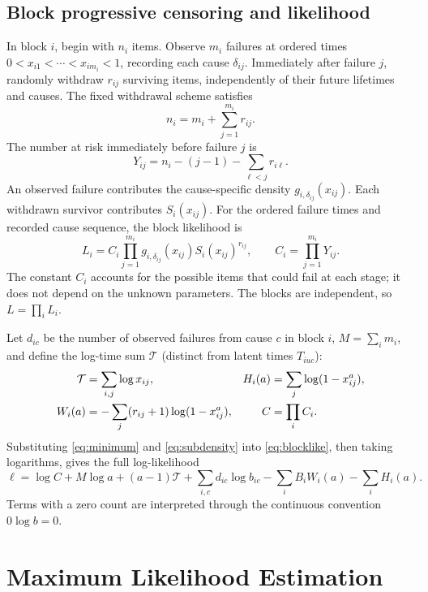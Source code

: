 \documentclass[a4paper,11pt]{article}
\begin{document}
\subsection{Block progressive censoring and likelihood}
In block $i$, begin with $n_i$ items. Observe $m_i$ failures at ordered times $0<x_{i1}<\cdots<x_{im_i}<1$, recording each cause $\delta_{ij}$. Immediately after failure $j$, randomly withdraw $r_{ij}$ surviving items, independently of their future lifetimes and causes. The fixed withdrawal scheme satisfies
\begin{equation}\label{eq:scheme}
n_i=m_i+\sum_{j=1}^{m_i}r_{ij}.
\end{equation}
The number at risk immediately before failure $j$ is
\begin{equation}\label{eq:risk}
Y_{ij}=n_i-(j-1)-\sum_{\ell<j}r_{i\ell}.
\end{equation}
An observed failure contributes the cause-specific density $g_{i,\delta_{ij}}(x_{ij})$. Each withdrawn survivor contributes $S_i(x_{ij})$. For the ordered failure times and recorded cause sequence, the block likelihood is
\begin{equation}\label{eq:blocklike}
L_i=C_i\prod_{j=1}^{m_i}g_{i,\delta_{ij}}(x_{ij})S_i(x_{ij})^{r_{ij}},\qquad
C_i=\prod_{j=1}^{m_i}Y_{ij}.
\end{equation}
The constant $C_i$ accounts for the possible items that could fail at each stage; it does not depend on the unknown parameters. The blocks are independent, so $L=\prod_i L_i$.

Let $d_{ic}$ be the number of observed failures from cause $c$ in block $i$, $M=\sum_i m_i$, and define the log-time sum $\mathcal{T}$ (distinct from latent times $T_{iuc}$):
\begin{align}\label{eq:stats}
\mathcal{T}&=\sum_{i,j}\log x_{ij},&
H_i(a)&=\sum_j\log(1-x_{ij}^a),\\\notag
W_i(a)&=-\sum_j(r_{ij}+1)\log(1-x_{ij}^a),&
C&=\prod_i C_i.
\end{align}
Substituting \eqref{eq:minimum} and \eqref{eq:subdensity} into \eqref{eq:blocklike}, then taking logarithms, gives the full log-likelihood
\begin{equation}\label{eq:loglike}
\boxed{\ell=\log C+M\log a+(a-1)\mathcal{T}+\sum_{i,c}d_{ic}\log b_{ic}
-\sum_i B_iW_i(a)-\sum_iH_i(a).}
\end{equation}
Terms with a zero count are interpreted through the continuous convention $0\log b=0$.

\section{Maximum Likelihood Estimation}\label{sec:mle}
\end{document}
